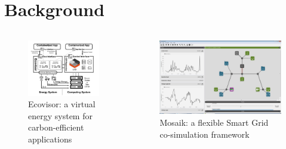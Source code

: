 \documentclass[aspectratio=169, 10pt]{beamer}
\def\textwidth{}%
\begin{document}
\section{Background}
\begin{frame}
    \begin{columns}[c]
        \column{.5\textwidth}
        \begin{figure}
            \centering
            \includegraphics[width=.7\textwidth]{ecovisor_design}
            \caption{Ecovisor: a virtual energy system for carbon-efficient applications}
            \label{fig:ecovisor_design}
        \end{figure}
        \column{.5\textwidth}
        \begin{figure}
            \centering
            \includegraphics[width=.7\textwidth]{ecovisor_desktop}
            \caption{Mosaik: a flexible Smart Grid co-simulation framework}
            \label{fig:ecovisor_desktop}
        \end{figure}
    \end{columns}
\end{frame}
\end{document}
